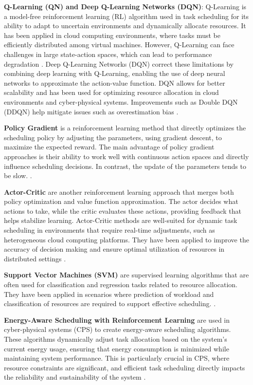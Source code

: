 \textbf{Q-Learning (QN) and Deep Q-Learning Networks (DQN)}: Q-Learning is a model-free reinforcement learning (RL) algorithm used in task scheduling for its ability to adapt to uncertain environments and dynamically allocate resources. It has been applied in cloud computing environments, where tasks must be efficiently distributed among virtual machines. However, Q-Learning can face challenges in large state-action spaces, which can lead to performance degradation \cite{Shobak2023}. Deep Q-Learning Networks (DQN) correct these limitations by combining deep learning with Q-Learning, enabling the use of deep neural networks to approximate the action-value function. DQN allows for better scalability and has been used for optimizing resource allocation in cloud environments and cyber-physical systems. Improvements such as Double DQN (DDQN) help mitigate issues such as overestimation bias \cite{jalali2024,kayhan2023}.

\textbf{Policy Gradient} is a reinforcement learning method that directly optimizes the scheduling policy by adjusting the parameters, using gradient descent, to maximize the expected reward. The main advantage of policy gradient approaches is their ability to work well with continuous action spaces and directly influence scheduling decisions. In contrast, the update of the parameters tends to be slow. \cite{Lu2023}.

\textbf{Actor-Critic} are another reinforcement learning approach that merges both policy optimization and value function approximation. The actor decides what actions to take, while the critic evaluates these actions, providing feedback that helps stabilize learning. Actor-Critic methods are well-suited for dynamic task scheduling in environments that require real-time adjustments, such as heterogeneous cloud computing platforms. They have been applied to improve the accuracy of decision making and ensure optimal utilization of resources in distributed settings \cite{kayhan2023}.

\textbf{Support Vector Machines (SVM)} are supervised learning algorithms that are often used for classification and regression tasks related to resource allocation. They have been applied in scenarios where prediction of workload and classification of resources are required to support effective scheduling. \cite{satyanarayana2018}.

\textbf{Energy-Aware Scheduling with Reinforcement Learning} are used in cyber-physical systems (CPS) to create energy-aware scheduling algorithms. These algorithms dynamically adjust task allocation based on the system's current energy usage, ensuring that energy consumption is minimized while maintaining system performance. This is particularly crucial in CPS, where resource constraints are significant, and efficient task scheduling directly impacts the reliability and sustainability of the system \cite{Shobak2023}.

